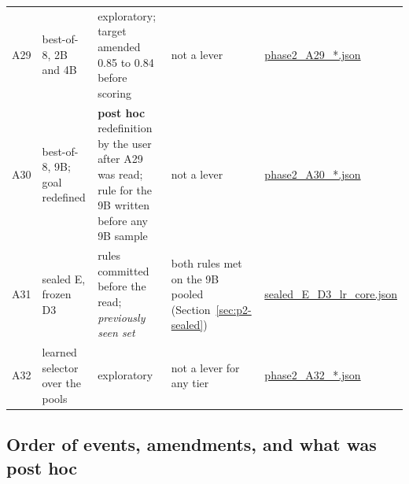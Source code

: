 \documentclass[11pt,a4paper]{article}
\newcommand{\code}[1]{\texttt{\detokenize{#1}}}
\begin{document}
\begin{table}[!htbp]
\begin{tabular}{l p{3.6cm} p{2.3cm} p{4.8cm} p{3.0cm}}
A29 & best-of-8, 2B and 4B & exploratory; target amended 0.85 to 0.84 before scoring & not a lever & \url{phase2_A29_*.json}\\
A30 & best-of-8, 9B; goal redefined & \textbf{post hoc} redefinition by the user after A29 was read; rule for the 9B written before any 9B sample & not a lever & \url{phase2_A30_*.json}\\
A31 & sealed E, frozen D3 \code{lr|core} & rules committed before the read; \emph{previously seen set} & both rules met on the 9B pooled (Section~\ref{sec:p2-sealed}) & \url{sealed_E_D3_lr_core.json}\\
A32 & learned selector over the pools & exploratory & not a lever for any tier & \url{phase2_A32_*.json}\\
\bottomrule\end{tabular}\end{table}

\subsection{Order of events, amendments, and what was post hoc}\label{sec:p2-order}
\end{document}
